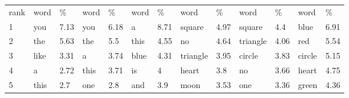 \begin{figure*}
{{\begin{tabular*}{0.9\textwidth}{@{\extracolsep{\fill}}lllllllllllll}
        rank & \hspace{1ex}word & \% & \hspace{1ex}word & \% & \hspace{1ex}word & \% & \hspace{1ex}word & \% & \hspace{1ex}word & \% & \hspace{1ex}word & \%\\
        \cmidrule(lr){2-3}\cmidrule(lr){4-5}\cmidrule(lr){6-7}\cmidrule(lr){8-9}\cmidrule(lr){10-11}\cmidrule(lr){12-13}
        1 & \hspace{1ex}you & 7.13 & \hspace{1ex}you & 6.18 & \hspace{1ex}a & 8.71 & \hspace{1ex}square & 4.97 & \hspace{1ex}square & 4.4 & \hspace{1ex}blue & 6.91\\
        2 & \hspace{1ex}the & 5.63 & \hspace{1ex}the & 5.5 & \hspace{1ex}this & 4.55 & \cellcolor[gray]{0.85}\hspace{1ex}no & 4.64 & \hspace{1ex}triangle & 4.06 & \hspace{1ex}red & 5.54\\
        3 & \hspace{1ex}like & 3.31 & \hspace{1ex}a & 3.74 & \hspace{1ex}blue & 4.31 & \hspace{1ex}triangle & 3.95 & \hspace{1ex}circle & 3.83 & \hspace{1ex}circle & 5.15\\
        4 & \hspace{1ex}a & 2.72 & \hspace{1ex}this & 3.71 & \hspace{1ex}is & 4 & \hspace{1ex}heart & 3.8 & \cellcolor[gray]{0.85}\hspace{1ex}no & 3.66 & \hspace{1ex}heart & 4.75\\
        5 & \hspace{1ex}this & 2.7 & \hspace{1ex}one & 2.8 & \hspace{1ex}and & 3.9 & \hspace{1ex}moon & 3.53 & \hspace{1ex}one & 3.36 & \hspace{1ex}green & 4.36\\

\end{tabular*}}}
\end{figure*}
